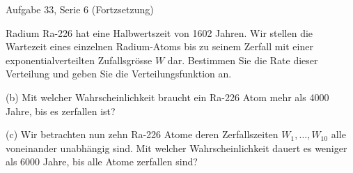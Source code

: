 \documentclass{beamer}
\begin{document}
\begin{frame}{Aufgabe 33, Serie 6 (Fortzsetzung)}
\begin{outline}
\item Radium Ra-226 hat eine Halbwertszeit von 1602 Jahren. Wir stellen die Wartezeit
eines einzelnen Radium-Atoms bis zu seinem Zerfall mit einer exponentialverteilten
Zufallsgrösse $W$ dar. Bestimmen Sie die Rate dieser Verteilung und geben Sie die
Verteilungsfunktion an.
\item[(b)] Mit welcher Wahrscheinlichkeit braucht ein Ra-226 Atom mehr als 4000 Jahre, bis
es zerfallen ist?
\item[(c)] Wir betrachten nun zehn Ra-226 Atome deren Zerfallszeiten $W_1, \dots, W_{10}$ alle voneinander 
unabhängig sind. Mit welcher Wahrscheinlichkeit dauert es weniger als
6000 Jahre, bis alle Atome zerfallen sind?
\end{outline}
\end{frame}
\end{document}
